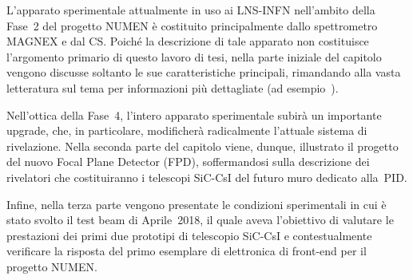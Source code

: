 

L'apparato sperimentale attualmente in uso ai LNS-INFN nell'ambito della Fase~2 del progetto NUMEN è costituito principalmente dallo spettrometro MAGNEX e dal CS.
Poiché la descrizione di tale apparato non costituisce l'argomento primario di questo lavoro di tesi, nella parte iniziale del capitolo vengono discusse soltanto le sue caratteristiche principali, rimandando alla vasta letteratura sul tema per informazioni più dettagliate (ad esempio~\cite{cavallaro:epja12, carbone:epja12, cappuzzello:epja16, cunsolo:epjst07}).

Nell'ottica della Fase~4, l'intero apparato sperimentale subirà un importante upgrade, che, in particolare, modificherà radicalmente l'attuale sistema di rivelazione.
Nella seconda parte del capitolo viene, dunque, illustrato il progetto del nuovo Focal Plane Detector (FPD), soffermandosi sulla descrizione dei rivelatori che costituiranno i telescopi SiC-CsI del futuro muro dedicato alla~PID.


Infine, nella terza parte vengono presentate le condizioni sperimentali in cui è stato svolto il test beam di Aprile~2018, il quale aveva l'obiettivo di valutare le prestazioni dei primi due prototipi di telescopio SiC-CsI e contestualmente verificare la risposta del primo esemplare di elettronica di front-end per il progetto NUMEN.



